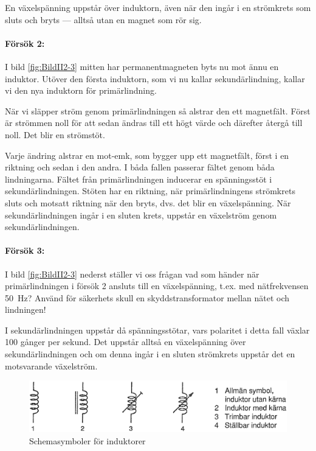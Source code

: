 En växelspänning uppstår över induktorn, även när den ingår i en strömkrets som
sluts och bryts --- alltså utan en magnet som rör sig.

\noindent\paragraph{Försök 2:} 

I bild \ref{fig:BildII2-3} mitten har permanentmagneten
byts nu mot ännu en induktor. Utöver den första induktorn, som vi nu kallar
sekundärlindning, kallar vi den nya induktorn för primärlindning.

När vi släpper ström genom primärlindningen så alstrar den ett magnetfält.
Först är strömmen noll för att sedan ändras till ett högt värde och därefter
återgå till noll. Det blir en strömstöt.

Varje ändring alstrar en mot-emk, som bygger upp ett magnetfält, först i en
riktning och sedan i den andra. I båda fallen passerar fältet genom båda
lindningarna. Fältet från primärlindningen inducerar en spänningsstöt i
sekundärlindningen. Stöten har en riktning, när primärlindningens strömkrets
sluts och motsatt riktning när den bryts, dvs. det blir en växelspänning.
När sekundärlindningen ingår i en sluten krets, uppstår en växelström genom
sekundärlindningen.

\noindent\paragraph{Försök 3:}

I bild \ref{fig:BildII2-3} nederst ställer vi oss frågan vad som händer när
primärlindningen i försök 2 ansluts till en växelspänning, t.ex.
med nätfrekvensen 50~Hz? Använd för säkerhets skull en skyddstransformator
mellan nätet och lindningen!

I sekundärlindningen uppstår då spänningsstötar, vars polaritet i detta fall
växlar 100 gånger per sekund. Det uppstår alltså en växelspänning över
sekundärlindningen och om denna ingår i en sluten strömkrets uppstår det en
motsvarande växelström.


\begin{figure}
\includegraphics[width=\textwidth]{images/cropped_pdfs/bild_2_2-04.pdf}
\caption{Schemasymboler för induktorer}
\label{fig:BildII2-4}
\end{figure}

